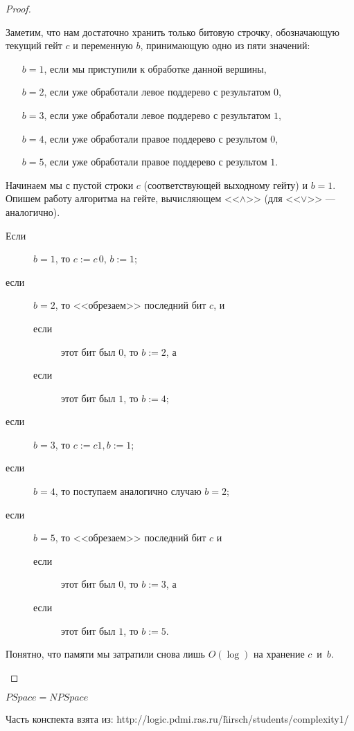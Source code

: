 \begin{proof}
\begin{enumerate}
{\small
Заметим, что нам достаточно хранить только битовую строчку,
обозначающую текущий гейт $c$ и переменную $b$, принимающую одно из пяти значений:
\begin{enumerate}
\item[$b=1$,] \leftskip 3mm
              если мы приступили к обработке данной вершины, 
\item[$b=2$,] если уже обработали левое поддерево с результатом $0$,
\item[$b=3$,] если уже обработали левое поддерево с результатом $1$,
\item[$b=4$,] если уже обработали правое поддерево с результом $0$,
\item[$b=5$,] если уже обработали правое поддерево с результом $1$.
\end{enumerate}
Начинаем мы с пустой строки $c$ (соответствующей выходному гейту)
и $b=1$. Опишем работу алгоритма на гейте, вычисляющем <<$\land$>> 
(для <<$\lor$>> --- аналогично). 
\begin{description}
\item[Если] $b=1$, то $c:=c\,0$, $b:=1$;
\item[если] $b=2$, то <<обрезаем>> последний бит $c$, и 
\begin{description}
\item[если] этот бит был $0$, то $b:=2$, а
\item[если] этот бит был $1$, то $b:=4$;
\end{description}
\item[если] $b=3$, то $c:=c1, b:=1$;
\item[если] $b=4$, то поступаем аналогично случаю $b=2$;
\item[если] $b=5$, то <<обрезаем>> последний бит $c$ и
\begin{description}
\item[если] этот бит был $0$, то $b:=3$, а
\item[если] этот бит был $1$, то $b:=5$.
\end{description}
\end{description}
Понятно, что памяти мы затратили снова лишь $O(\log)$ на хранение $c$~и~$b$.
}
\end{enumerate}
\end{proof}

\begin{conseq}                                          	
$PSpace = NPSpace$\\
\end{conseq}

\begin{Rem}
Часть конспекта взята из: http://logic.pdmi.ras.ru/\~hirsch/students/complexity1/
\end{Rem}